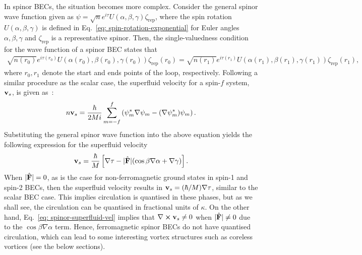 In spinor BECs, the situation becomes more complex.
Consider the general spinor wave function given as \(\psi =
\sqrt{n}e^{i\tau}U(\alpha, \beta, \gamma)\zeta_\text{rep}\), where the spin
rotation \(U(\alpha, \beta, \gamma)\) is defined in
Eq.~\eqref{eq: spin-rotation-exponential} for Euler angles
\(\alpha, \beta, \gamma \) and \(\zeta_\text{rep}\) is a representative spinor.
Then, the single-valuedness condition for the wave function of a spinor BEC
states that~\cite{Kawaguchi2012}
\begin{align}
    \sqrt{n(r_0)}e^{i\tau(r_0)}U(\alpha(r_0), \beta(r_0), \gamma(r_0))
    \zeta_\text{rep}(r_0) = \sqrt{n(r_1)}e^{i\tau(r_1)}
    U(\alpha(r_1), \beta(r_1), \gamma(r_1)) \zeta_\text{rep}(r_1),
\end{align}
where \(r_0, r_1\) denote the start and ends points of the loop, respectively.
Following a similar procedure as the scalar case, the superfluid velocity for a
spin-\(f\) system, \(\vb{v}_s\), is given as~\cite{Kawaguchi2012}:
\begin{align}\label{eq: spinor-mass-current}
    n\vb{v}_s = \frac{\hbar}{2Mi}\sum_{m=-f}^f\left(\psi^*_m\nabla\psi_m
    - {(\nabla \psi_m^*)}\psi_m\right).
\end{align}
Substituting the general spinor wave function into the above equation yields
the following expression for the superfluid velocity
\begin{align}\label{eq: spinor-superfluid-vel}
    \vb{v}_s = \frac{\hbar}{M}\left[\nabla\tau - |\hat{\vb{F}}| (
        \cos\beta\nabla\alpha + \nabla\gamma)\right].
\end{align}
When \(|\hat{\vb{F}}| = 0\), as is the case for non-ferromagnetic ground states
in spin-1 and spin-2 BECs, then the superfluid velocity results in
\(\vb{v}_s=(\hbar/M)\nabla\tau \), similar to the scalar BEC case.
This implies circulation is quantised in these phases, but as we shall see, the
circulation can be quantised in fractional units of \(\kappa \).
On the other hand, Eq.~\eqref{eq: spinor-superfluid-vel} implies that
\(\nabla \cross \vb{v}_s \neq 0\) when \(|\hat{\vb{F}}| \neq 0\) due to the
\(\cos\beta\nabla\alpha \) term.
Hence, ferromagnetic spinor BECs do not have quantised circulation, which can
lead to some interesting vortex structures such as coreless vortices (see the
below sections).


